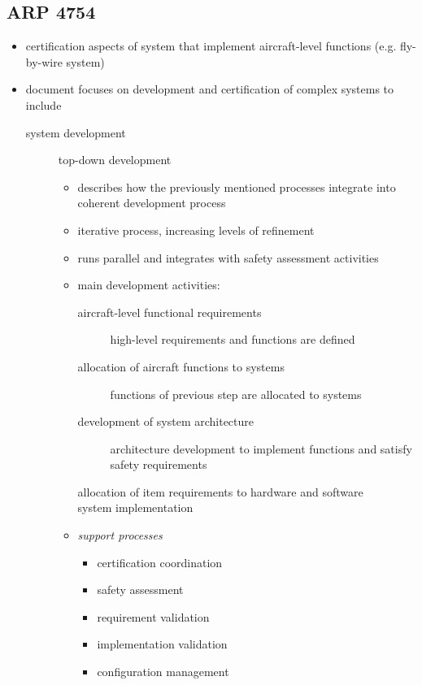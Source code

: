 \documentclass[a4paper, 10pt]{article}
\begin{document}
\subsection*{ARP 4754}
\begin{itemize}
    \item certification aspects of system that implement aircraft-level functions (e.g. fly-by-wire system)
    \item document focuses on development and certification of complex systems to include
    \begin{description}
        \item[system development] top-down development
        \begin{itemize}
            \item describes how the previously mentioned processes integrate into coherent development process
            \item iterative process, increasing levels of refinement
            \item runs parallel and integrates with safety assessment activities
            \item main development activities:
            \begin{description}
                \item[aircraft-level functional requirements] high-level requirements and functions are defined
                \item[allocation of aircraft functions to systems] functions of previous step are allocated to systems
                \item[development of system architecture] architecture development to implement functions and satisfy safety requirements
                \item[allocation of item requirements to hardware and software]
                \item[system implementation]
            \end{description}
            \item \emph{support processes}
            \begin{itemize}
                \item certification coordination
                \item safety assessment
                \item requirement validation
                \item implementation validation
                \item configuration management

\end{itemize}
\end{itemize}
\end{description}
\end{itemize}
\end{document}
